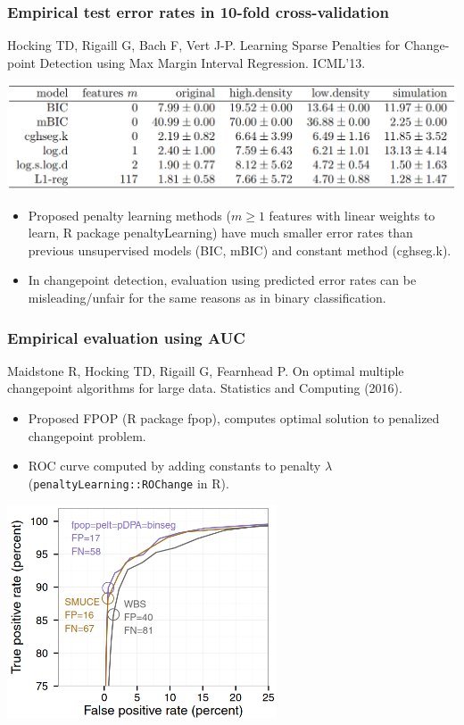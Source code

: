 \documentclass[t]{beamer}
\DeclareMathOperator*{\argmin}{arg\,min}
\begin{document}
\begin{frame}
  \frametitle{Empirical test error rates in 10-fold cross-validation}
  {\scriptsize Hocking TD, Rigaill G, Bach F, Vert J-P. Learning Sparse Penalties
  for Change-point Detection using Max Margin Interval
  Regression. ICML'13.}

  \includegraphics[width=\textwidth]{table-ICML13-error-rates}

  \begin{itemize}
  \item   Proposed penalty learning methods ($m\geq 1$ features with linear
  weights to learn, R package penaltyLearning) have much smaller error rates than previous
  unsupervised models (BIC, mBIC) and constant method (cghseg.k).
\item In changepoint detection, evaluation using predicted error rates
  can be misleading/unfair for the same reasons as in binary classification.
  \end{itemize}
\end{frame}

\begin{frame}
  \frametitle{Empirical evaluation using AUC}

  {\scriptsize Maidstone R, Hocking TD, Rigaill G, Fearnhead P. On optimal multiple
  changepoint algorithms for large data. Statistics and Computing
  (2016).}

  \begin{itemize}
  \item Proposed FPOP (R package fpop), computes optimal solution to
    penalized changepoint problem.
  \item ROC curve computed by adding constants to penalty $\lambda$
    (\texttt{penaltyLearning::ROChange} in R).
  \end{itemize}
\includegraphics[width=0.6\textwidth]{figure-Maidstone-roc}
\end{frame}
\end{document}
